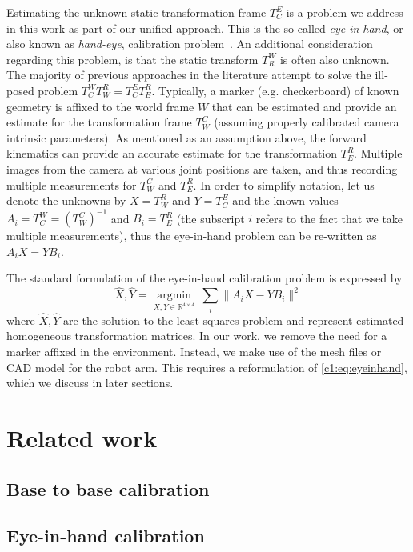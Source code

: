 Estimating the unknown static transformation frame $T^E_C$ is a problem we address in this work as part of our unified approach.
This is the so-called \textit{eye-in-hand}, or also known as \textit{hand-eye}, calibration problem~\cite{Horaud95}.
An additional consideration regarding this problem, is that the static transform $T^W_R$ is often also unknown.
The majority of previous approaches in the literature attempt to solve the ill-posed problem $T^W_C T^R_W = T^E_C T^R_E$.
Typically, a marker (e.g. checkerboard) of known geometry is affixed to the world frame $W$ that can be estimated and provide an estimate for the transformation frame $T^C_W$ (assuming properly calibrated camera intrinsic parameters).
As mentioned as an assumption above, the forward kinematics can provide an accurate estimate for the transformation $T^R_E$.
Multiple images from the camera at various joint positions are taken, and thus recording multiple measurements for $T^C_W$ and $T^R_E$.
In order to simplify notation, let us denote the unknowns by $X=T^R_W$ and $Y=T^E_C$ and the known values $A_i=T^W_C = (T^C_W)^{-1}$ and $B_i=T^R_E$ (the subscript $i$ refers to the fact that we take multiple measurements), thus the eye-in-hand problem can be re-written as $A_i X = Y B_i$.

The standard formulation of the eye-in-hand calibration problem is expressed by
\begin{equation}
\label{c1:eq:eyeinhand}
    \widehat{X}, \widehat{Y} = \underset{X, Y\in\mathbb{R}^{4\times 4}}{\text{arg}\min}~\sum_i \| A_i X - Y B_i\|^2
\end{equation}
where $\widehat{X}, \widehat{Y}$ are the solution to the least squares problem and represent estimated homogeneous transformation matrices.
In our work, we remove the need for a marker affixed in the environment.
Instead, we make use of the mesh files or CAD model for the robot arm.
This requires a reformulation of \eqref{c1:eq:eyeinhand}, which we discuss in later sections.

\section{Related work}

\subsection{Base to base calibration}

\subsection{Eye-in-hand calibration}

